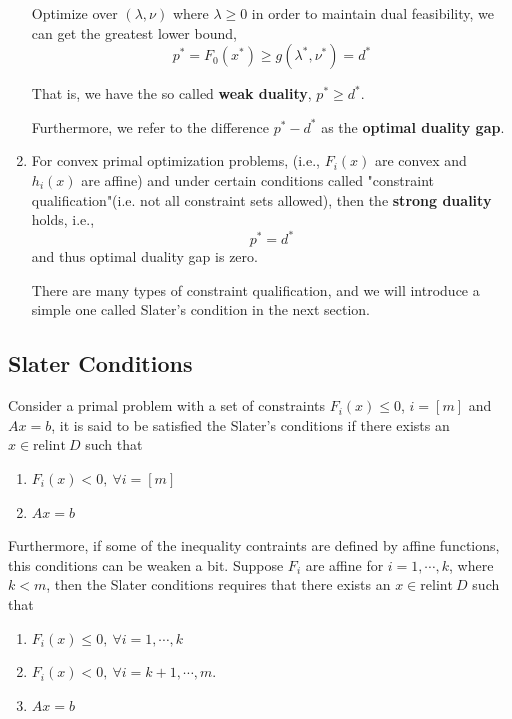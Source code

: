 \begin{enumerate}
	Optimize over $(\lambda, \nu)$ where $\lambda \geq 0$ in order to maintain dual feasibility, we can get the greatest lower bound,
	\begin{equation*}
		p^* = F_0(x^*) \geq g(\lambda^*, \nu^*) = d^*
	\end{equation*}
	
	That is, we have the so called \textbf{weak duality}, $p^*\geq d^*$. 
	
	Furthermore, we refer to the difference $p^* - d^*$ as the \textbf{optimal duality gap}.
	
	
	\item For convex primal optimization problems, (i.e., $F_i(x)$ are convex and $h_i(x)$ are affine) and under certain conditions called "constraint qualification"(i.e. not all constraint sets allowed), then the \textbf{strong duality} holds, i.e.,
	$$p^* = d^*$$
	and thus optimal duality gap is zero.
	
	There are many types of constraint qualification, and we will introduce a simple one called Slater's condition in the next section.
	
\end{enumerate}


\subsection{Slater Conditions}

\begin{definition}
	Consider a primal problem with a set of constraints $F_i(x)\leq 0$, $i = [m]$ and $Ax = b$, it is said to be satisfied the Slater's conditions if there exists an $x\in\text{relint}\ D$ such that
	
	\begin{enumerate}
		\item $F_i(x) < 0,\ \forall i = [m]$
		
		\item $Ax = b$
	\end{enumerate}
	
	Furthermore, if some of the inequality contraints are defined by affine functions, this conditions can be weaken a bit. Suppose $F_i$ are affine for $i=1,\cdots, k$, where $k<m$, then the Slater conditions requires that there exists an $x\in\text{relint}\ D$ such that
	\begin{enumerate}
		\item $F_i(x) \leq 0,\ \forall i = 1,\cdots, k$
		\item $F_i(x) < 0,\ \forall i = k+1,\cdots,m$.
		\item $Ax = b$
	\end{enumerate}
	
\end{definition}

